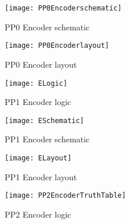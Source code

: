 \documentclass[conference]{IEEEtran}
\begin{document}
\begin{figure}[!htb]
\centering
\texttt{[image: PP0Encoderschematic]}
\caption{PP0 Encoder schematic}
\label{fig_sim}
\end{figure}

\begin{figure}[!htb]
\centering
\texttt{[image: PP0Encoderlayout]}
\caption{PP0 Encoder layout}
\label{fig_sim}
\end{figure}

\begin{figure}[!htb]
\centering
\texttt{[image: ELogic]}
\caption{PP1 Encoder logic}
\label{fig_sim}
\end{figure}

\begin{figure}[!htb]
\centering
\texttt{[image: ESchematic]}
\caption{PP1 Encoder schematic}
\label{fig_sim}
\end{figure}

\begin{figure}[!htb]
\centering
\texttt{[image: ELayout]}
\caption{PP1 Encoder layout}
\label{fig_sim}
\end{figure}

\begin{figure}[!htb]
\centering
\texttt{[image: PP2EncoderTruthTable]}
\caption{PP2 Encoder logic}
\label{fig_sim}
\end{figure}

\clearpage
\end{document}
